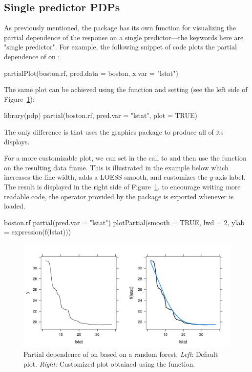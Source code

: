 \subsection{Single predictor PDPs}

As previously mentioned, the  package has its own  function for visualizing the partial dependence of the response on a single predictor---the keywords here are "single predictor". For example, the following snippet of code plots the partial dependence of  on :
\begin{example}
partialPlot(boston.rf, pred.data = boston, x.var = "lstat")
\end{example}
The same plot can be achieved using the  function and setting  (see the left side of Figure~\ref{fig:pd_lstat}):
\begin{example}
library(pdp)
partial(boston.rf, pred.var = "lstat", plot = TRUE)
\end{example}
The only difference is that  uses the  graphics package to produce all of its displays.

For a more customizable plot, we can set  in the call to  and then use the  function on the resulting data frame. This is illustrated in the example below which increases the line width, adds a LOESS smooth, and customizes the $y$-axis label. The result is displayed in the right side of Figure~\ref{fig:pd_lstat}.  to encourage writing more readable code, the  operator \code{\%>\%} provided by the  package \citep{magrittr-pkg} is exported whenever  is loaded.
\begin{example}
boston.rf %
  partial(pred.var = "lstat") %
  plotPartial(smooth = TRUE, lwd = 2, ylab = expression(f(lstat)))
\end{example}

\begin{figure}[!htbp]
  \centering
  \includegraphics[width=1.0\linewidth]{pd_lstat}
  \caption{Partial dependence of  on  based on a random forest. \textit{Left}: Default plot. \textit{Right}: Customized plot obtained using the  function.}
  \label{fig:pd_lstat}
\end{figure}


